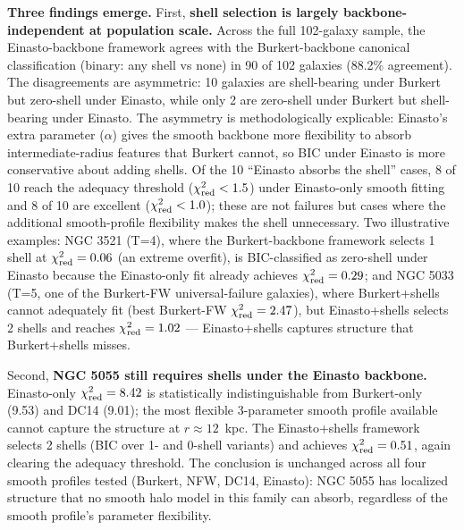 \textbf{Three findings emerge.} First, \textbf{shell selection is largely backbone-independent at population scale.} Across the full 102-galaxy sample, the Einasto-backbone framework agrees with the Burkert-backbone canonical classification (binary: any shell vs none) in 90 of 102 galaxies (88.2\% agreement). The disagreements are asymmetric: 10 galaxies are shell-bearing under Burkert but zero-shell under Einasto, while only 2 are zero-shell under Burkert but shell-bearing under Einasto. The asymmetry is methodologically explicable: Einasto's extra parameter ($\alpha$) gives the smooth backbone more flexibility to absorb intermediate-radius features that Burkert cannot, so BIC under Einasto is more conservative about adding shells. Of the 10 ``Einasto absorbs the shell'' cases, 8 of 10 reach the adequacy threshold ($\chi^2_{\rm red} < 1.5$) under Einasto-only smooth fitting and 8 of 10 are excellent ($\chi^2_{\rm red} < 1.0$); these are not failures but cases where the additional smooth-profile flexibility makes the shell unnecessary. Two illustrative examples: NGC 3521 (T=4), where the Burkert-backbone framework selects 1 shell at $\chi^2_{\rm red} = 0.06$ (an extreme overfit), is BIC-classified as zero-shell under Einasto because the Einasto-only fit already achieves $\chi^2_{\rm red} = 0.29$; and NGC 5033 (T=5, one of the Burkert-FW universal-failure galaxies), where Burkert+shells cannot adequately fit (best Burkert-FW $\chi^2_{\rm red} = 2.47$), but Einasto+shells selects 2 shells and reaches $\chi^2_{\rm red} = 1.02$ --- Einasto+shells captures structure that Burkert+shells misses.

Second, \textbf{NGC 5055 still requires shells under the Einasto backbone.} Einasto-only $\chi^2_{\rm red} = 8.42$ is statistically indistinguishable from Burkert-only (9.53) and DC14 (9.01); the most flexible 3-parameter smooth profile available cannot capture the structure at $r \approx 12$~kpc. The Einasto+shells framework selects 2 shells (BIC over 1- and 0-shell variants) and achieves $\chi^2_{\rm red} = 0.51$, again clearing the adequacy threshold. The conclusion is unchanged across all four smooth profiles tested (Burkert, NFW, DC14, Einasto): NGC 5055 has localized structure that no smooth halo model in this family can absorb, regardless of the smooth profile's parameter flexibility.

